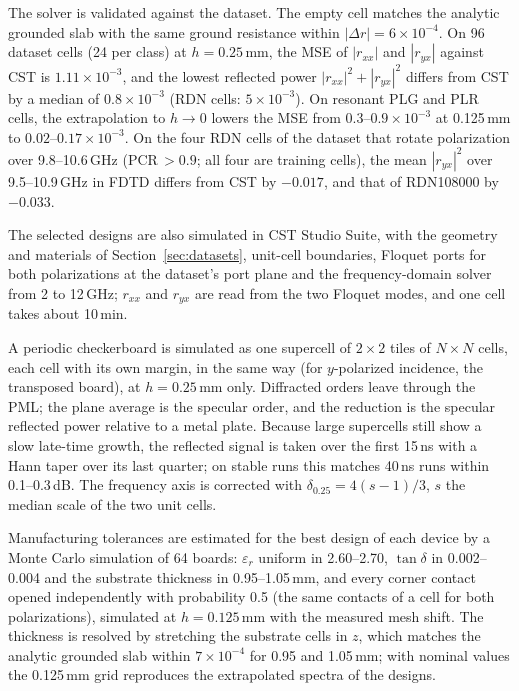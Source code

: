 \documentclass[journal]{IEEEtran}
\newcommand{\e}[2]{\ensuremath{#1{\times}10^{#2}}}
\begin{document}
The solver is validated against the dataset. The empty cell matches the analytic grounded slab with the same ground resistance within $|\Delta r|=\e{6}{-4}$. On 96 dataset cells (24 per class) at $h=0.25$\,mm, the MSE of $|r_{xx}|$ and $|r_{yx}|$ against CST is \e{1.11}{-3}, and the lowest reflected power $|r_{xx}|^2+|r_{yx}|^2$ differs from CST by a median of \e{0.8}{-3} (RDN cells: \e{5}{-3}). On resonant PLG and PLR cells, the extrapolation to $h\to0$ lowers the MSE from \e{0.3\text{--}0.9}{-3} at 0.125\,mm to \e{0.02\text{--}0.17}{-3}. On the four RDN cells of the dataset that rotate polarization over 9.8--10.6\,GHz (PCR\,$>0.9$; all four are training cells), the mean $|r_{yx}|^2$ over 9.5--10.9\,GHz in FDTD differs from CST by $-0.017$, and that of RDN108000 by $-0.033$.

The selected designs are also simulated in CST Studio Suite, with the geometry and materials of Section~\ref{sec:datasets}, unit-cell boundaries, Floquet ports for both polarizations at the dataset's port plane and the frequency-domain solver from 2 to 12\,GHz; $r_{xx}$ and $r_{yx}$ are read from the two Floquet modes, and one cell takes about 10\,min.

A periodic checkerboard is simulated as one supercell of $2\times2$ tiles of $N\times N$ cells, each cell with its own margin, in the same way (for $y$-polarized incidence, the transposed board), at $h=0.25$\,mm only. Diffracted orders leave through the PML; the plane average is the specular order, and the reduction is the specular reflected power relative to a metal plate. Because large supercells still show a slow late-time growth, the reflected signal is taken over the first 15\,ns with a Hann taper over its last quarter; on stable runs this matches 40\,ns runs within 0.1--0.3\,dB. The frequency axis is corrected with $\delta_{0.25}=4(s-1)/3$, $s$ the median scale of the two unit cells.

Manufacturing tolerances are estimated for the best design of each device by a Monte Carlo simulation of 64 boards: $\varepsilon_r$ uniform in 2.60--2.70, $\tan\delta$ in 0.002--0.004 and the substrate thickness in 0.95--1.05\,mm, and every corner contact opened independently with probability 0.5 (the same contacts of a cell for both polarizations), simulated at $h=0.125$\,mm with the measured mesh shift. The thickness is resolved by stretching the substrate cells in $z$, which matches the analytic grounded slab within \e{7}{-4} for 0.95 and 1.05\,mm; with nominal values the 0.125\,mm grid reproduces the extrapolated spectra of the designs.
\end{document}
